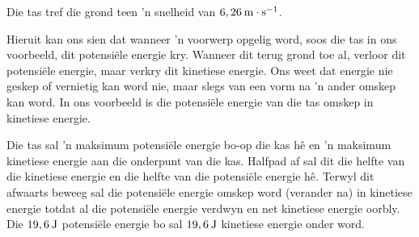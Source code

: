 Die tas tref die grond teen   'n snelheid van $6,26\phantom{\rule{2pt}{0ex}}\text{m}\ensuremath{\cdot}\text{s}{}^{-1}$.\par 
Hieruit kan ons sien dat wanneer   'n voorwerp opgelig word, soos die tas in ons voorbeeld, dit potensiële energie kry. Wanneer dit terug grond toe al, verloor dit potensiële energie, maar verkry dit kinetiese energie. Ons weet dat energie nie geskep of vernietig kan word nie, maar slegs van een vorm na   'n ander omskep kan word. In ons voorbeeld is die potensiële energie van die tas omskep in kinetiese energie.\par 
Die tas sal   'n maksimum potensiële energie bo-op die kas hê en   'n maksimum kinetiese energie aan die onderpunt van die kas. Halfpad af sal dit die helfte van die kinetiese energie en die helfte van die potensiële energie hê. Terwyl dit afwaarts beweeg sal die potensiële energie omskep word (verander na) in kinetiese energie totdat al die potensiële energie verdwyn en net kinetiese energie oorbly. Die $19,6\phantom{\rule{2pt}{0ex}}\text{J}$ potensiële energie bo sal $19,6\phantom{\rule{2pt}{0ex}}\text{J}$ kinetiese energie onder word.\par 


